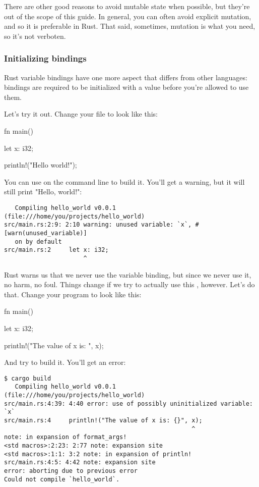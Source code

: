 \blank

There are other good reasons to avoid mutable state when possible, but they're out of the scope of this guide. In general, you can
often avoid explicit mutation, and so it is preferable in Rust. That said, sometimes, mutation is what you need, so it's not 
verboten.

\subsubsection*{Initializing bindings}

Rust variable bindings have one more aspect that differs from other languages: bindings are required to be initialized with a 
value before you're allowed to use them.

\blank

Let's try it out. Change your  file to look like this:

\begin{rustc}
fn main() {
    let x: i32;

    println!("Hello world!");
}
\end{rustc}

You can use  on the command line to build it. You'll get a warning, but it will still print "Hello, world!":

\begin{verbatim}
   Compiling hello_world v0.0.1 (file:///home/you/projects/hello_world)
src/main.rs:2:9: 2:10 warning: unused variable: `x`, #[warn(unused_variable)]
   on by default
src/main.rs:2     let x: i32;
                      ^
\end{verbatim}

Rust warns us that we never use the variable binding, but since we never use it, no harm, no foul. Things change if we try to
actually use this \x, however. Let's do that. Change your program to look like this:

\begin{rustc}
fn main() {
    let x: i32;

    println!("The value of x is: {}", x);
}
\end{rustc}

And try to build it. You'll get an error:

\begin{verbatim}
$ cargo build
   Compiling hello_world v0.0.1 (file:///home/you/projects/hello_world)
src/main.rs:4:39: 4:40 error: use of possibly uninitialized variable: `x`
src/main.rs:4     println!("The value of x is: {}", x);
                                                    ^
note: in expansion of format_args!
<std macros>:2:23: 2:77 note: expansion site
<std macros>:1:1: 3:2 note: in expansion of println!
src/main.rs:4:5: 4:42 note: expansion site
error: aborting due to previous error
Could not compile `hello_world`.
\end{verbatim}

